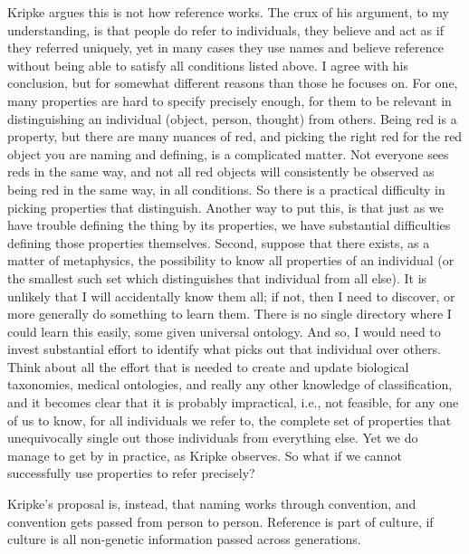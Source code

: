 Kripke argues this is not how reference works. The crux of his argument, to my understanding, is that people do refer to individuals, they believe and act as if they referred uniquely, yet in many cases they use names and believe reference without being able to satisfy all conditions listed above. I agree with his conclusion, but for somewhat different reasons than those he focuses on. For one, many properties are hard to specify precisely enough, for them to be relevant in distinguishing an individual (object, person, thought) from others. Being red is a property, but there are many nuances of red, and picking the right red for the red object you are naming and defining, is a complicated matter. Not everyone sees reds in the same way, and not all red objects will consistently be observed as being red in the same way, in all conditions. So there is a practical difficulty in picking properties that distinguish. Another way to put this, is that just as we have trouble defining the thing by its properties, we have substantial difficulties defining those properties themselves. Second, suppose that there exists, as a matter of metaphysics, the possibility to know all properties of an individual (or the smallest such set which distinguishes that individual from all else). It is unlikely that I will accidentally know them all; if not, then I need to discover, or more generally do something to learn them. There is no single directory where I could learn this easily, some given universal ontology. And so, I would need to invest substantial effort to identify what picks out that individual over others. Think about all the effort that is needed to create and update biological taxonomies, medical ontologies, and really any other knowledge of classification, and it becomes clear that it is probably impractical, i.e., not feasible, for any one of us to know, for all individuals we refer to, the complete set of properties that unequivocally single out those individuals from everything else. Yet we do manage to get by in practice, as Kripke observes. So what if we cannot successfully use properties to refer precisely?

Kripke's proposal is, instead, that naming works through convention, and convention gets passed from person to person. Reference is part of culture, if culture is all non-genetic information passed across generations.

